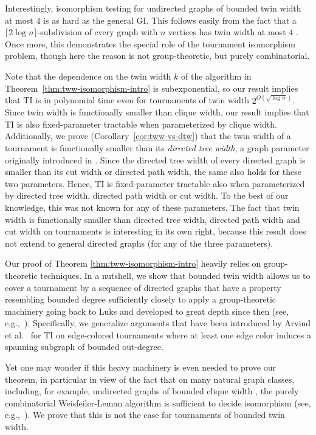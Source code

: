 \documentclass{theoretics}
\begin{document}
Interestingly, isomorphism testing for undirected graphs of bounded twin width at most $4$ is as hard as the general GI.
This follows easily from the fact that a $\lceil 2\log n\rceil$-subdivision of every graph with $n$ vertices has twin width at most $4$ \cite{BergeBD22}.
Once more, this demonstrates the special role of the tournament isomorphism problem, though here the reason is not group-theoretic, but purely combinatorial.

Note that the dependence on the twin width $k$ of the algorithm in Theorem~\ref{thm:tww-isomorphism-intro} is subexponential, so our result implies that TI is in polynomial time even for tournaments of twin width $2^{O(\sqrt{\log n})}$.
Since twin width is functionally smaller than clique width, our result implies that TI is also fixed-parameter tractable when parameterized by clique width.
Additionally, we prove (Corollary~\ref{cor:tww-vs-dtw}) that the twin width of a tournament is functionally smaller than its \emph{directed tree width}, a graph parameter originally introduced in \cite{JohnsonRST01}.
Since the directed tree width of every directed graph is smaller than its cut width or directed path width, the same also holds for these two parameters.
Hence, TI is fixed-parameter tractable also when parameterized by directed tree width, directed path width or cut width.
To the best of our knowledge, this was not known for any of these parameters.
The fact that twin width is functionally smaller than directed tree width, directed path width and cut width on tournaments is interesting in its own right, because this result does not extend to general directed graphs (for any of the three parameters).

Our proof of Theorem \ref{thm:tww-isomorphism-intro} heavily relies on group-theoretic techniques.
In a nutshell, we show that bounded twin width allows us to cover a tournament by a sequence of directed graphs that have a property resembling bounded degree sufficiently closely to apply a group-theoretic machinery going back to Luks \cite{Luks82} and developed to great depth since then (see, e.g.,~\cite{Babai16,BabaiL83,GroheNS23,Miller83,Neuen22}).
Specifically, we generalize arguments that have been introduced by Arvind et al.~\cite{ArvindPR25} for TI on edge-colored tournaments where at least one edge color induces a spanning subgraph of bounded out-degree.

Yet one may wonder if this heavy machinery is even needed to prove our theorem, in particular in view of the fact that on many natural graph classes,
including, for example, undirected graphs of bounded clique width \cite{GroheN23}, the purely combinatorial Weisfeiler-Leman algorithm is sufficient to decide isomorphism (see, e.g.,~\cite{Grohe17,Kiefer20}).
We prove that this is not the case for tournaments of bounded twin width.
\end{document}
